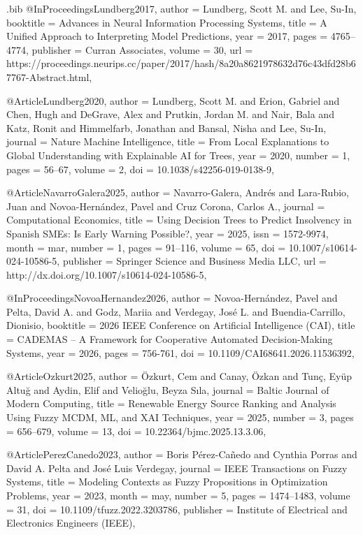 \begin{filecontents*}[overwrite]{\jobname.bib}
@InProceedings{Lundberg2017,
  author    = {Lundberg, Scott M. and Lee, Su-In},
  booktitle = {Advances in Neural Information Processing Systems},
  title     = {A Unified Approach to Interpreting Model Predictions},
  year      = {2017},
  pages     = {4765--4774},
  publisher = {Curran Associates},
  volume    = {30},
  url       = {https://proceedings.neurips.cc/paper/2017/hash/8a20a8621978632d76c43dfd28b67767-Abstract.html},
}

@Article{Lundberg2020,
  author  = {Lundberg, Scott M. and Erion, Gabriel and Chen, Hugh and DeGrave, Alex and Prutkin, Jordan M. and Nair, Bala and Katz, Ronit and Himmelfarb, Jonathan and Bansal, Nisha and Lee, Su-In},
  journal = {Nature Machine Intelligence},
  title   = {From Local Explanations to Global Understanding with Explainable {AI} for Trees},
  year    = {2020},
  number  = {1},
  pages   = {56--67},
  volume  = {2},
  doi     = {10.1038/s42256-019-0138-9},
}

@Article{NavarroGalera2025,
  author    = {Navarro-Galera, Andrés and Lara-Rubio, Juan and Novoa-Hernández, Pavel and Cruz Corona, Carlos A.},
  journal   = {Computational Economics},
  title     = {Using Decision Trees to Predict Insolvency in Spanish SMEs: Is Early Warning Possible?},
  year      = {2025},
  issn      = {1572-9974},
  month     = mar,
  number    = {1},
  pages     = {91–116},
  volume    = {65},
  doi       = {10.1007/s10614-024-10586-5},
  publisher = {Springer Science and Business Media LLC},
  url       = {http://dx.doi.org/10.1007/s10614-024-10586-5},
}

@InProceedings{NovoaHernandez2026,
  author    = {Novoa-Hernández, Pavel and Pelta, David A. and Godz, Mariia and Verdegay, José L. and Buendia-Carrillo, Dionisio},
  booktitle = {2026 IEEE Conference on Artificial Intelligence (CAI)},
  title     = {CADEMAS – A Framework for Cooperative Automated Decision-Making Systems},
  year      = {2026},
  pages     = {756-761},
  doi       = {10.1109/CAI68641.2026.11536392},
}

@Article{Ozkurt2025,
  author  = {\"Ozkurt, Cem and Canay, \"Ozkan and Tun{\c{c}}, Ey{\"u}p Altu{\u{g}} and Aydin, Elif and Velio{\u{g}}lu, Beyza S{\i}la},
  journal = {Baltic Journal of Modern Computing},
  title   = {Renewable Energy Source Ranking and Analysis Using Fuzzy {MCDM}, {ML}, and {XAI} Techniques},
  year    = {2025},
  number  = {3},
  pages   = {656--679},
  volume  = {13},
  doi     = {10.22364/bjmc.2025.13.3.06},
}

@Article{PerezCanedo2023,
  author    = {Boris P{\'{e}}rez-Ca{\~{n}}edo and Cynthia Porras and David A. Pelta and Jos{\'{e}} Luis Verdegay},
  journal   = {{IEEE} Transactions on Fuzzy Systems},
  title     = {Modeling Contexts as Fuzzy Propositions in Optimization Problems},
  year      = {2023},
  month     = {may},
  number    = {5},
  pages     = {1474--1483},
  volume    = {31},
  doi       = {10.1109/tfuzz.2022.3203786},
  publisher = {Institute of Electrical and Electronics Engineers ({IEEE})},
}


\end{filecontents*}
